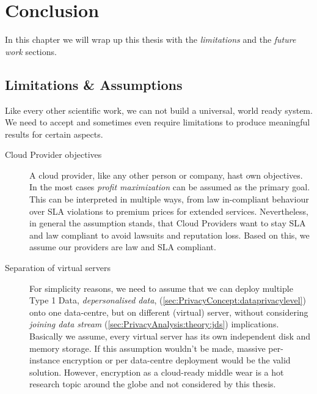
\chapter{Conclusion}
\label{ch:Conclusion}

In this chapter we will wrap up this thesis with the \textit{limitations} and the \textit{future work} sections.

\section{Limitations \& Assumptions}
\label{sec:Conculsion:limits}

Like every other scientific work, we can not build a universal, world ready system. We need to accept and sometimes even require limitations to produce meaningful results for certain aspects.

\begin{description}
	\item[Cloud Provider objectives]
	A cloud provider, like any other person or company, hast own objectives. In the most cases \textit{profit maximization} can be assumed as the primary goal. This can be interpreted in multiple ways, from law in-compliant behaviour over SLA violations to premium prices for extended services. Nevertheless, in general the assumption stands, that Cloud Providers want to stay SLA and law compliant to avoid lawsuits and reputation loss. Based on this, we assume our providers are law and SLA compliant.
\end{description}	


\begin{description}
	\item[Separation of virtual servers]
	For simplicity reasons, we need to assume that we can deploy multiple Type 1 Data, \textit{depersonalised data}, (\autoref{sec:PrivacyConcept:dataprivacylevel}) onto one data-centre, but on different (virtual) server, without considering \textit{joining data stream} (\autoref{sec:PrivacyAnalysis:theory:jds}) implications. Basically we assume, every virtual server has its own independent disk and memory storage.	If this assumption wouldn’t be made, massive per-instance encryption or per data-centre deployment would be the valid solution. However, encryption as a cloud-ready middle wear is a hot research topic around the globe and not considered by this thesis.
\end{description}

